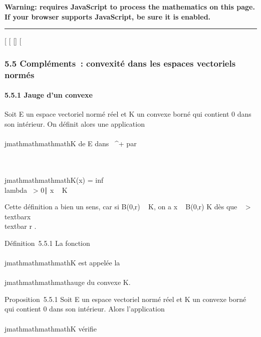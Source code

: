 \textbf{Warning: 
requires JavaScript to process the mathematics on this page.\\ If your
browser supports JavaScript, be sure it is enabled.}

\begin{center}\rule{3in}{0.4pt}\end{center}

{[}
{[}
{[}{]}
{[}

\subsubsection{5.5 Compléments~: convexité dans les espaces vectoriels
normés}

\paragraph{5.5.1 Jauge d'un convexe}

Soit E un espace vectoriel normé réel et K un convexe borné qui contient
0 dans son intérieur. On définit alors une application \\\\jmathmathmathmathK de E
dans ~^+ par

\\\\jmathmathmathmathK(x) = inf~ \\lambda~
\textgreater{} 0∣ x \over
\lambda~ \in K\

Cette définition a bien un sens, car si B(0,r) \subset~ K, on a  x
\over \lambda~ \in B(0,r) \in K dès que \lambda~ \textgreater{}
\\textbar{}x\\textbar{}
\over r .

Définition~5.5.1 La fonction \\\\jmathmathmathmathK est appelée la \\\\jmathmathmathmathauge du
convexe K.

Proposition~5.5.1 Soit E un espace vectoriel normé réel et K un convexe
borné qui contient 0 dans son intérieur. Alors l'application
\\\\jmathmathmathmathK vérifie


